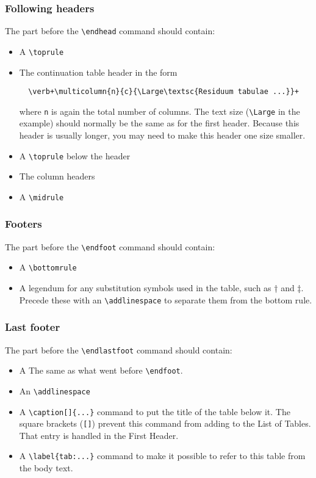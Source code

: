 \documentclass{report}
\begin{document}
\subsubsection{Following headers}
The part before the \verb+\endhead+ command should contain:
\begin{itemize}
\item A \verb+\toprule+
\item The continuation table header in the form
\begin{verbatim}
  \verb+\multicolumn{n}{c}{\Large\textsc{Residuum tabulae ...}}+
\end{verbatim}
where \verb+n+ is again the total number of columns.
The text size
(\verb+\Large+ in the example) should normally be the same as for the first
header.
Because this header is usually longer, you may need to make this header one
size smaller.
\item A \verb+\toprule+ below the header
\item The column headers
\item A \verb+\midrule+
\end{itemize}

\subsubsection{Footers}
The part before the \verb+\endfoot+ command should contain:
\begin{itemize}
\item A \verb+\bottomrule+
\item A legendum for any substitution symbols used in the table,
such as \super† and \super‡.
Precede these with an \verb+\addlinespace+ to separate them from the bottom
rule.
\end{itemize}

\subsubsection{Last footer}
The part before the \verb+\endlastfoot+ command should contain:
\begin{itemize}
\item A The same as what went before \verb+\endfoot+.
\item An \verb+\addlinespace+
\item A \verb+\caption[]{...}+ command to put the title of the table below it.
The square brackets (\verb+[]+) prevent this command from adding to the List
of Tables. That entry is handled in the First Header.
\item A \verb+\label{tab:...}+ command to make it possible to refer to this
table from the body text.
\end{itemize}
\end{document}
